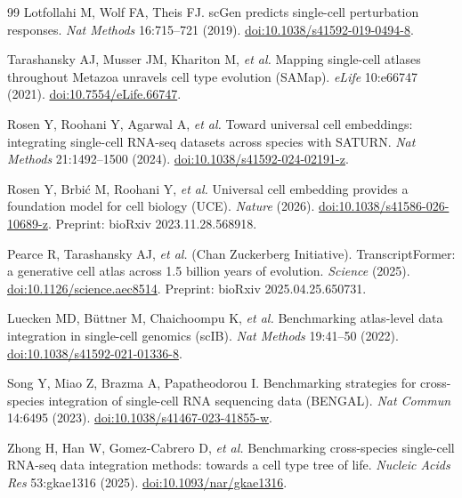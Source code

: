 \documentclass[10pt,twocolumn]{article}
\begin{document}
\begin{thebibliography}{99}
 Lotfollahi M, Wolf FA, Theis FJ.
scGen predicts single-cell perturbation responses.
\emph{Nat Methods} 16:715--721 (2019).
\href{https://doi.org/10.1038/s41592-019-0494-8}{doi:10.1038/s41592-019-0494-8}.

 Tarashansky AJ, Musser JM, Khariton M, \emph{et al.}
Mapping single-cell atlases throughout Metazoa unravels cell type evolution (SAMap).
\emph{eLife} 10:e66747 (2021).
\href{https://doi.org/10.7554/eLife.66747}{doi:10.7554/eLife.66747}.

 Rosen Y, Roohani Y, Agarwal A, \emph{et al.}
Toward universal cell embeddings: integrating single-cell RNA-seq datasets across
species with SATURN. \emph{Nat Methods} 21:1492--1500 (2024).
\href{https://doi.org/10.1038/s41592-024-02191-z}{doi:10.1038/s41592-024-02191-z}.

 Rosen Y, Brbi\'c M, Roohani Y, \emph{et al.}
Universal cell embedding provides a foundation model for cell biology (UCE).
\emph{Nature} (2026).
\href{https://doi.org/10.1038/s41586-026-10689-z}{doi:10.1038/s41586-026-10689-z}.
Preprint: bioRxiv 2023.11.28.568918.

 Pearce R, Tarashansky AJ, \emph{et al.}
(Chan Zuckerberg Initiative). TranscriptFormer: a generative cell atlas across
1.5 billion years of evolution. \emph{Science} (2025).
\href{https://doi.org/10.1126/science.aec8514}{doi:10.1126/science.aec8514}.
Preprint: bioRxiv 2025.04.25.650731.

 Luecken MD, B\"uttner M, Chaichoompu K, \emph{et al.}
Benchmarking atlas-level data integration in single-cell genomics (scIB).
\emph{Nat Methods} 19:41--50 (2022).
\href{https://doi.org/10.1038/s41592-021-01336-8}{doi:10.1038/s41592-021-01336-8}.

 Song Y, Miao Z, Brazma A, Papatheodorou I.
Benchmarking strategies for cross-species integration of single-cell RNA sequencing
data (BENGAL). \emph{Nat Commun} 14:6495 (2023).
\href{https://doi.org/10.1038/s41467-023-41855-w}{doi:10.1038/s41467-023-41855-w}.

 Zhong H, Han W, Gomez-Cabrero D, \emph{et al.}
Benchmarking cross-species single-cell RNA-seq data integration methods: towards a
cell type tree of life. \emph{Nucleic Acids Res} 53:gkae1316 (2025).
\href{https://doi.org/10.1093/nar/gkae1316}{doi:10.1093/nar/gkae1316}.

\end{thebibliography}
\end{document}

